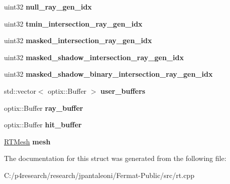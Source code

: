 \begin{DoxyCompactItemize}
\mbox{\label{struct_r_t_context_impl_afeca42d7216b01fc253cd79cbb12834d}} 
uint32 {\bfseries null\+\_\+ray\+\_\+gen\+\_\+idx}
\item 
\mbox{\label{struct_r_t_context_impl_a5ab526617130d2810f3396307a9f60a5}} 
uint32 {\bfseries tmin\+\_\+intersection\+\_\+ray\+\_\+gen\+\_\+idx}
\item 
\mbox{\label{struct_r_t_context_impl_a76ea60f68893a73cf961d7f46058d349}} 
uint32 {\bfseries masked\+\_\+intersection\+\_\+ray\+\_\+gen\+\_\+idx}
\item 
\mbox{\label{struct_r_t_context_impl_a46552f7f5c4cf3c37364a419caa8aafb}} 
uint32 {\bfseries masked\+\_\+shadow\+\_\+intersection\+\_\+ray\+\_\+gen\+\_\+idx}
\item 
\mbox{\label{struct_r_t_context_impl_ab3799caf6f504b5f0c8f1828cdcce034}} 
uint32 {\bfseries masked\+\_\+shadow\+\_\+binary\+\_\+intersection\+\_\+ray\+\_\+gen\+\_\+idx}
\item 
\mbox{\label{struct_r_t_context_impl_a39952c219f540b00ccc3c3dffa7935a3}} 
std\+::vector$<$ optix\+::\+Buffer $>$ {\bfseries user\+\_\+buffers}
\item 
\mbox{\label{struct_r_t_context_impl_aaff0e3e58bba04a0735a5252fa88d798}} 
optix\+::\+Buffer {\bfseries ray\+\_\+buffer}
\item 
\mbox{\label{struct_r_t_context_impl_aa3a6223f2d76ca92d83164d18a36e7b4}} 
optix\+::\+Buffer {\bfseries hit\+\_\+buffer}
\item 
\mbox{\label{struct_r_t_context_impl_afb5f884318c993d83301c66d0b6553d9}} 
\hyperlink{struct_r_t_mesh}{R\+T\+Mesh} {\bfseries mesh}
\end{DoxyCompactItemize}


The documentation for this struct was generated from the following file\+:\begin{DoxyCompactItemize}
\item 
C\+:/p4research/research/jpantaleoni/\+Fermat-\/\+Public/src/rt.\+cpp\end{DoxyCompactItemize}

